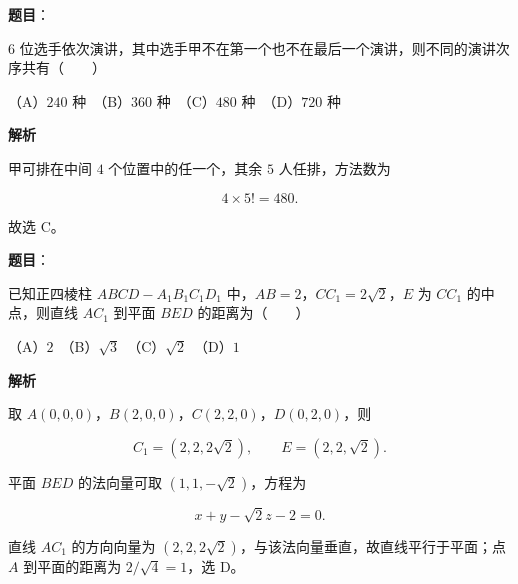 \begin{answer}

\textbf{题目}：

$6$ 位选手依次演讲，其中选手甲不在第一个也不在最后一个演讲，则不同的演讲次序共有\mbox{（　　）}

（A）$240$ 种　（B）$360$ 种　（C）$480$ 种　（D）$720$ 种

\textbf{解析}

甲可排在中间 $4$ 个位置中的任一个，其余 $5$ 人任排，方法数为

\nopagebreak[4]
\[
4\times5!=480.
\]

故选 C。


\end{answer}
\begin{answer}

\textbf{题目}：

已知正四棱柱 $ABCD-A_1B_1C_1D_1$ 中，$AB=2$，$CC_1=2\sqrt2$，$E$ 为 $CC_1$ 的中点，则直线 $AC_1$ 到平面 $BED$ 的距离为\mbox{（　　）}

（A）$2$　（B）$\sqrt3$　（C）$\sqrt2$　（D）$1$

\textbf{解析}

取 $A(0,0,0)$，$B(2,0,0)$，$C(2,2,0)$，$D(0,2,0)$，则

\nopagebreak[4]
\[
C_1=(2,2,2\sqrt2),\qquad E=(2,2,\sqrt2).
\]

平面 $BED$ 的法向量可取 $(1,1,-\sqrt2)$，方程为

\nopagebreak[4]
\[
x+y-\sqrt2z-2=0.
\]

直线 $AC_1$ 的方向向量为 $(2,2,2\sqrt2)$，与该法向量垂直，故直线平行于平面；点 $A$ 到平面的距离为 $2/\sqrt4=1$，选 D。


\end{answer}
